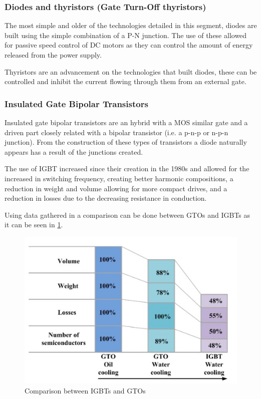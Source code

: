 \subsubsection{Diodes and thyristors (Gate Turn-Off thyristors)}
The most simple and older of the technologies detailed in this segment, diodes are built using the simple combination of a P-N junction. The use of these allowed for passive speed control of DC motors as they can control the amount of energy released from the power supply.

Thyristors are an advancement on the technologies that built diodes, these can be controlled and inhibit the current flowing through them from an external gate.
\subsubsection{Insulated Gate Bipolar Transistors}
Insulated gate bipolar transistors are an hybrid with a MOS similar gate and a driven part closely related with a bipolar transistor (i.e. a p-n-p or n-p-n junction). From the construction of these types of transistors a diode naturally appears has a result of the junctions created. 

The use of IGBT increased since their creation in the 1980s and allowed for the increased in switching frequency, creating better harmonic compositions, a reduction in weight and volume allowing for more compact drives, and a reduction in losses due to the decreasing resistance in conduction. 

Using data gathered in \cite{MainSOTA} a comparison can be done between GTOs and IGBTs as it can be seen in \ref{fig:GTOvIGBT}.

\begin{figure}[h]
    \centering
    \includegraphics{Figures/IGBTvGTO.jpg}
    \caption{Comparison between IGBTs and GTOs \cite{MainSOTA}}
    \label{fig:GTOvIGBT}
\end{figure}

